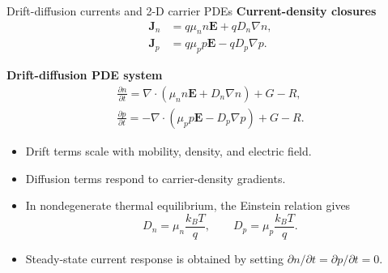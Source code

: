 \documentclass[aspectratio=169,10pt]{beamer}
\begin{document}
\begin{frame}{Drift-diffusion currents and 2-D carrier PDEs}
\small
\textbf{Current-density closures}
\vspace{-0.25em}
\begin{align*}
\mathbf J_n&=q\mu_n n\mathbf E+qD_n\nabla n,\\[-0.15em]
\mathbf J_p&=q\mu_p p\mathbf E-qD_p\nabla p.
\end{align*}

\vspace{-0.15em}
\textbf{Drift-diffusion PDE system}
\vspace{-0.25em}
\begin{align*}
\boxed{\frac{\partial n}{\partial t}
=\nabla\cdot\left(\mu_n n\mathbf E+D_n\nabla n\right)+G-R,}\\[-0.05em]
\boxed{\frac{\partial p}{\partial t}
=-\nabla\cdot\left(\mu_p p\mathbf E-D_p\nabla p\right)+G-R.}
\end{align*}

\vspace{-0.15em}
\begin{itemize}
    \item Drift terms scale with mobility, density, and electric field.
    \item Diffusion terms respond to carrier-density gradients.
    \item In nondegenerate thermal equilibrium, the Einstein relation gives
    \[
        D_n=\mu_n\frac{k_BT}{q},
        \qquad
        D_p=\mu_p\frac{k_BT}{q}.
    \]
    \item Steady-state current response is obtained by setting $\partial n/\partial t=\partial p/\partial t=0$.
\end{itemize}
\end{frame}
\end{document}
